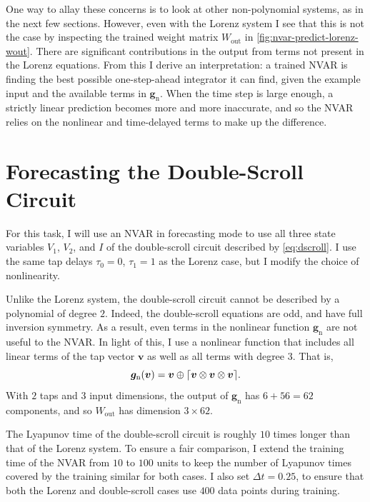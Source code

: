 One way to allay these concerns is to look at other non-polynomial
systems, as in the next few sections. However, even with the Lorenz
system I see that this is not the case by inspecting the trained
weight matrix $W_\text{out}$ in
\cref{fig:nvar-predict-lorenz-wout}. There are significant contributions
in the output from terms not present in the Lorenz equations. From
this I derive an interpretation: a trained NVAR is finding the best
possible one-step-ahead integrator it can find, given the example
input and the available terms in $\bm{g}_\text{n}$. When the time step
is large enough, a strictly linear prediction becomes more and more
inaccurate, and so the NVAR relies on the nonlinear and time-delayed
terms to make up the difference.

\section{Forecasting the Double-Scroll Circuit}

For this task, I will use an NVAR in forecasting mode to use all
three state variables $V_1$, $V_2$, and $I$ of the double-scroll
circuit described by \cref{eq:dscroll}. I use the same tap
delays $\tau_0 = 0$, $\tau_1 = 1$ as the Lorenz case, but I modify
the choice of nonlinearity.

Unlike the Lorenz system, the double-scroll circuit cannot be
described by a polynomial of degree $2$. Indeed, the double-scroll
equations are odd, and have full inversion
symmetry. As a result, even terms in the nonlinear function
$\bm{g}_\text{n}$ are not useful to the NVAR. In light of this, I use
a nonlinear function that includes all linear terms of the tap vector
$\bm{v}$ as well as all terms with degree $3$. That is,
\begin{equation}
  \bm{g}_\text{n}(\bm{v}) = \bm{v} \oplus \lceil\bm{v} \otimes \bm{v} \otimes \bm{v}\rceil.
\end{equation}
With $2$ taps and $3$ input dimensions, the output of
$\bm{g}_\text{n}$ has $6 + 56 = 62$ components, and so $W_\text{out}$
has dimension $3 \times 62$.

The Lyapunov time of the double-scroll circuit is roughly $10$ times
longer than that of the Lorenz system. To ensure a fair comparison, I
extend the training time of the NVAR from $10$ to $100$ units to keep
the number of Lyapunov times covered by the training similar for both
cases. I also set $\Delta t = 0.25$, to ensure that both the Lorenz
and double-scroll cases use $400$ data points during training.

